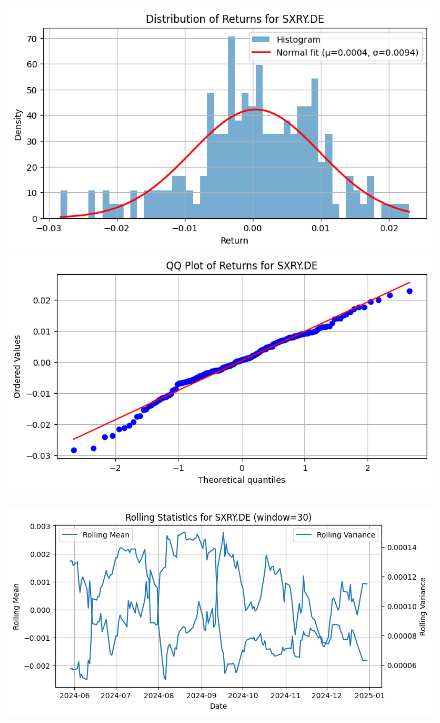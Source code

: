 \documentclass{article}%
\begin{document}
\begin{figure}[htbp]%
\begin{minipage}{0.49\textwidth}%
\includegraphics[width=\linewidth]{ticker_images/SXRY.DE_return_distribution.png}%
\end{minipage}%
\begin{minipage}{0.49\textwidth}%
\includegraphics[width=\linewidth]{ticker_images/SXRY.DE_qq_plot.png}%
\end{minipage}%
\end{figure}

%


\begin{figure}[htbp]%
\begin{minipage}{0.49\textwidth}%
\includegraphics[width=\linewidth]{ticker_images/SXRY.DE_rolling_stats.png}%
\end{minipage}%
\end{figure}
\end{document}
